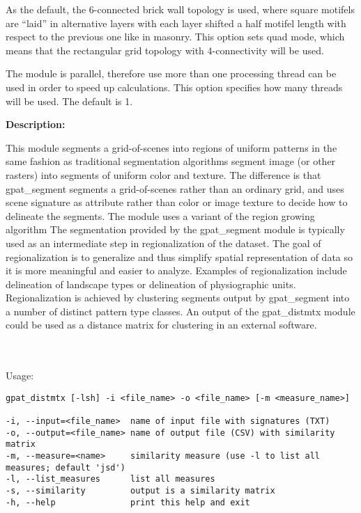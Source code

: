 
As the default, the 6-connected brick wall topology is used, where square motifels are “laid” in alternative layers with each layer shifted a half motifel length with respect to the previous one like in masonry. 
This option sets quad mode, which means that the rectangular grid topology with 4-connectivity will be used. 


The module is parallel, therefore use more than one processing thread can be used in order to speed up calculations. 
This option specifies how many threads will be used. 
The default is 1.

{\bf Description:}

This module segments a grid-of-scenes into regions of uniform patterns in the same fashion as traditional segmentation algorithms segment image (or other rasters) into segments of uniform color and texture.  %
The difference is that gpat\_segment segments a grid-of-scenes rather than an ordinary grid, and uses scene signature as attribute rather than color or image texture to decide how to delineate the segments. 
The module uses a variant of the region growing algorithm %
The segmentation provided by the gpat\_segment module is typically used as an intermediate step in regionalization of the
dataset. 
The goal of regionalization is to generalize and thus simplify spatial representation of data so it is more meaningful and
easier to analyze.
Examples of regionalization include delineation of landscape types %
or delineation of physiographic units. %
Regionalization is achieved by clustering segments output by gpat\_segment into a number of distinct pattern type classes.
An output of the gpat\_distmtx module could be used as a distance matrix for clustering in an external software.

{}
\\\\
Usage:

\begin{minipage}{\linewidth}
\begin{lstlisting}
gpat_distmtx [-lsh] -i <file_name> -o <file_name> [-m <measure_name>]

-i, --input=<file_name>  name of input file with signatures (TXT)
-o, --output=<file_name> name of output file (CSV) with similarity matrix
-m, --measure=<name>     similarity measure (use -l to list all measures; default 'jsd')
-l, --list_measures      list all measures
-s, --similarity         output is a similarity matrix
-h, --help               print this help and exit
\end{lstlisting}
\end{minipage}

